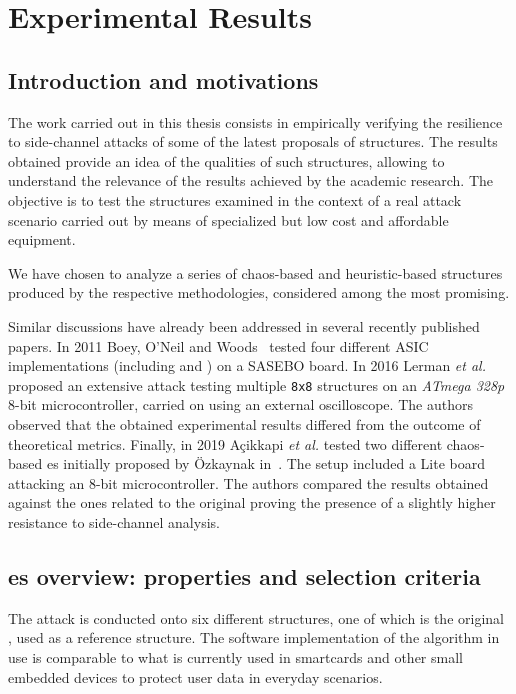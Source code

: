 \chapter{Experimental Results}\label{chap:expres}

    \section{Introduction and motivations}

    The work carried out in this thesis consists in empirically verifying the resilience to side-channel attacks of some of the latest proposals of \sbocs{} structures. The results obtained provide an idea of the qualities of such structures, allowing to understand the relevance of the results achieved by the academic research. The objective is to test the structures examined in the context of a real attack scenario carried out by means of specialized but low cost and affordable equipment.

    We have chosen to analyze a series of chaos-based and heuristic-based \sbocs{} structures produced by the respective methodologies, considered among the most promising.

    Similar discussions have already been addressed in several recently published papers. In 2011 Boey, O'Neil and Woods~\cite{boey2011resistant} tested four different ASIC implementations (including \aes{} and \des{}) on a SASEBO board. In 2016 Lerman \emph{et al.}~\cite{lerman2016comparing} proposed an extensive attack testing multiple \texttt{8x8} structures on an \emph{ATmega 328p} 8-bit microcontroller, carried on using an external oscilloscope. The authors observed that the obtained experimental results differed from the outcome of theoretical metrics. Finally, in 2019 Açikkapi \emph{et al.} tested two different chaos-based \sbocs{}es initially proposed by Özkaynak in~\cite{ozkaynak2019construction}. The setup included a \cw{} Lite board attacking an \xmega{} 8-bit microcontroller. The authors compared the results obtained against the ones related to the original \aes{} \sbocs{} proving the presence of a slightly higher resistance to side-channel analysis.

    \section{\sbocs{}es overview: properties and selection criteria}

        The attack is conducted onto six different \sbocs{} structures, one of which is the original \aes{} \sbocs{}, used as a reference structure. The software implementation of the \aess{} algorithm in use is comparable to what is currently used in smartcards and other small embedded devices to protect user data in everyday scenarios.

